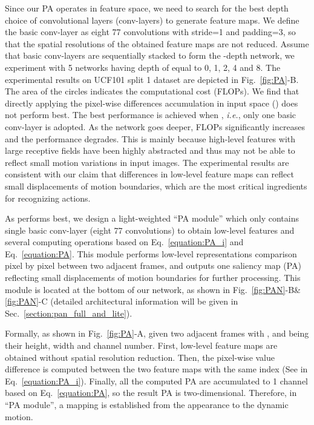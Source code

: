 \documentclass[journal]{IEEEtran}
\begin{document}
Since our PA operates in feature space, we need to search for the best depth choice of convolutional layers (conv-layers) to generate feature maps. We define the basic conv-layer as eight 77 convolutions with stride=1 and padding=3, so that the spatial resolutions of the obtained feature maps are not reduced. Assume that  basic conv-layers are sequentially stacked to form the -depth network, we experiment with 5 networks having depth of  equal to 0, 1, 2, 4 and 8. The experimental results on UCF101 split 1 dataset are depicted in Fig.~\ref{fig:PA}-B. The area of the circles indicates the computational cost (FLOPs). We find that directly applying the pixel-wise differences accumulation in input space () does not perform best. The best performance is achieved when , \emph{i.e.}, only one basic conv-layer is adopted. As the network goes deeper, FLOPs significantly increases and the performance degrades. This is mainly because high-level features with large receptive fields have been highly abstracted and thus may not be able to reflect small motion variations in input images. The experimental results are consistent with our claim that differences in low-level feature maps can reflect small displacements of motion boundaries, which are the most critical ingredients for recognizing actions.

As  performs best, we design a light-weighted ``PA module'' which only contains single basic conv-layer (eight 77 convolutions) to obtain low-level features and several computing operations based on Eq.~\ref{equation:PA_i} and Eq.~\ref{equation:PA}. This module performs low-level representations comparison pixel by pixel between two adjacent frames, and outputs one saliency map (PA) reflecting small displacements of motion boundaries for further processing. This module is located at the bottom of our network, as shown in Fig.~\ref{fig:PAN}-B\&\ref{fig:PAN}-C (detailed architectural information will be given in Sec.~\ref{section:pan_full_and_lite}). 

Formally, as shown in Fig.~\ref{fig:PA}-A, given two adjacent frames  with ,  and  being their height, width and channel number. First, low-level feature maps  are obtained without spatial resolution reduction. Then, the pixel-wise value difference is computed between the two feature maps with the same index  (See in Eq.~\ref{equation:PA_i}). Finally, all the computed PA are accumulated to 1 channel based on Eq.~\ref{equation:PA}, so the result PA  is two-dimensional. Therefore, in ``PA module'', a mapping  is established from the appearance to the dynamic motion.
\end{document}
